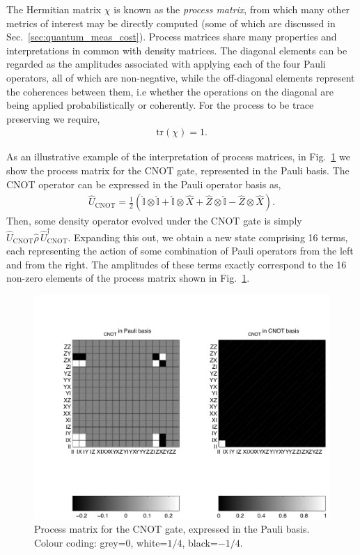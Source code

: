 \documentclass[aps, rmp, twocolumn, amsmath, amssymb, nofootinbib, superscriptaddress, longbibliography, floatfix, table-of-contents, eqsecnum]{revtex4-1}
\begin{document}
The Hermitian matrix $\chi$ is known as the \textit{process matrix}, from which many other metrics of interest may be directly computed (some of which are discussed in Sec.~\ref{sec:quantum_meas_cost}). Process matrices share many properties and interpretations in common with density matrices. The diagonal elements can be regarded as the amplitudes associated with applying each of the four Pauli operators, all of which are non-negative, while the off-diagonal elements represent the coherences between them, i.e whether the operations on the diagonal are being applied probabilistically or coherently. For the process to be trace preserving we require,
\begin{align}
\text{tr}(\chi) = 1.
\end{align}

As an illustrative example of the interpretation of process matrices, in Fig.~\ref{fig:CNOT_proc_matrix} we show the process matrix for the CNOT gate, represented in the Pauli basis. The CNOT operator can be expressed in the Pauli operator basis as,
\begin{align}
\hat{U}_\text{CNOT} = \frac{1}{2}(\hat{\mathbb{I}}\otimes \hat{\mathbb{I}} + \hat{\mathbb{I}} \otimes \hat{X} + \hat{Z}\otimes \hat{\mathbb{I}} - \hat{Z}\otimes \hat{X}).
\end{align}
Then, some density operator evolved under the CNOT gate is simply \mbox{$\hat{U}_\text{CNOT}\hat\rho \,\hat{U}_\text{CNOT}^\dag$}. Expanding this out, we obtain a new state comprising 16 terms, each representing the action of some combination of Pauli operators from the left and from the right. The amplitudes of these terms exactly correspond to the 16 non-zero elements of the process matrix shown in Fig.~\ref{fig:CNOT_proc_matrix}.

\begin{figure}[!htb]
\includegraphics[width=0.7\columnwidth]{CNOT_process}
\caption{Process matrix for the CNOT gate, expressed in the Pauli basis. Colour coding: grey=0, white=$1/4$, black=$-1/4$.} \label{fig:CNOT_proc_matrix}
\end{figure}
\end{document}

